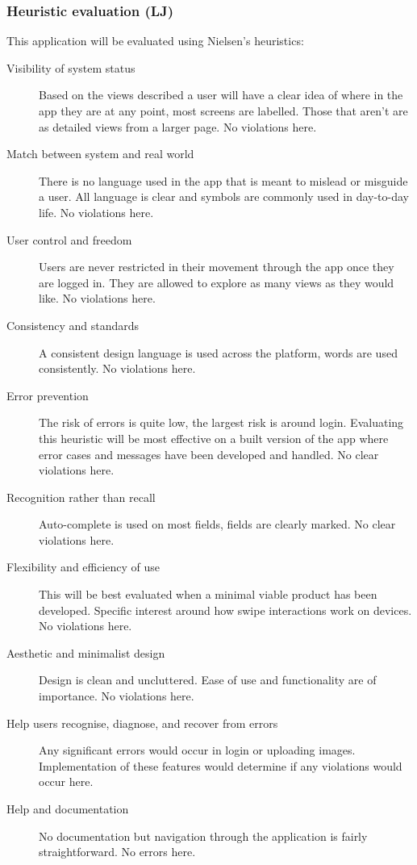 \documentclass[a4paper,12pt]{article}
\begin{document}
\subsubsection{Heuristic evaluation (LJ)}
This application will be evaluated using Nielsen's heuristics:
\begin{description}
    \item[Visibility of system status] Based on the views described a user will have a clear idea of where in the app they are at any point, most screens are labelled. Those that aren't are as detailed views from a larger page. No violations here.
    \item[Match between system and real world] There is no language used in the app that is meant to mislead or misguide a user. All language is clear and symbols are commonly used in day-to-day life. No violations here.
    \item[User control and freedom] Users are never restricted in their movement through the app once they are logged in. They are allowed to explore as many views as they would like. No violations here.
    \item[Consistency and standards] A consistent design language is used across the platform, words are used consistently. No violations here. 
    \item[Error prevention] The risk of errors is quite low, the largest risk is around login. Evaluating this heuristic will be most effective on a built version of the app where error cases and messages have been developed and handled. No clear violations here.
    \item[Recognition rather than recall] Auto-complete is used on most fields, fields are clearly marked. No clear violations here.
    \item[Flexibility and efficiency of use] This will be best evaluated when a minimal viable product has been developed. Specific interest around how swipe interactions work on devices. No violations here.
    \item[Aesthetic and minimalist design] Design is clean and uncluttered. Ease of use and functionality are of importance. No violations here.
    \item[Help users recognise, diagnose, and recover from errors] Any significant errors would occur in login or uploading images. Implementation of these features would determine if any violations would occur here.
    \item[Help and documentation] No documentation but navigation through the application is fairly straightforward. No errors here.
\end{description}
\end{document}
